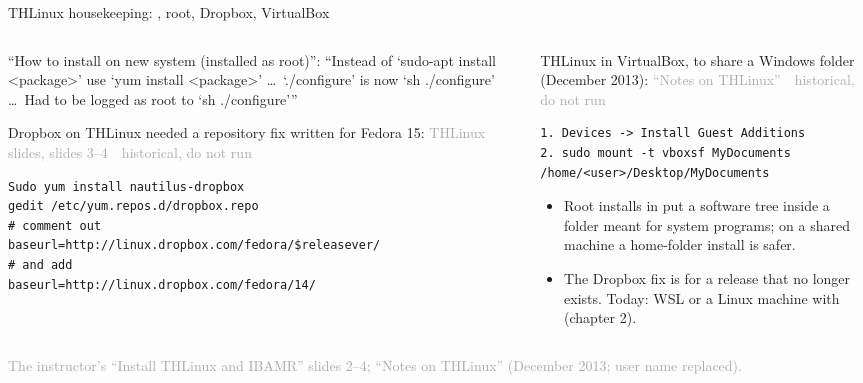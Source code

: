 \documentclass[aspectratio=169,11pt]{beamer}
\newcommand{\sourcecredit}[1]{\vfill\begin{flushright}\tiny\textcolor{DarkGray}{#1}\end{flushright}}
\newcommand{\hist}[1]{{\tiny\sffamily\textcolor{DarkGray}{#1\ \textbullet\ historical, do not run}}\par\nointerlineskip\vspace{0.3mm}}
\begin{document}
\begin{frame}[fragile]{THLinux housekeeping: , root, Dropbox, VirtualBox}
\label{fr:thlinux}
\begin{columns}[T,onlytextwidth]
\begin{column}{0.48\textwidth}
\footnotesize
``How to install on new system (installed as root)'': ``Instead of `sudo-apt install <package>' use `yum install <package>' \ldots\ `./configure' is now `sh ./configure' \ldots\ Had to be logged as root to `sh ./configure'{}''

\vspace{2mm}
Dropbox on THLinux needed a repository fix written for Fedora 15:
\hist{THLinux slides, slides 3--4}
\begin{lstlisting}[style=hist]
Sudo yum install nautilus-dropbox
gedit /etc/yum.repos.d/dropbox.repo
# comment out
baseurl=http://linux.dropbox.com/fedora/$releasever/
# and add
baseurl=http://linux.dropbox.com/fedora/14/
\end{lstlisting}
\end{column}
\begin{column}{0.49\textwidth}
\footnotesize
THLinux in VirtualBox, to share a Windows folder (December 2013):
\hist{``Notes on THLinux''}
\begin{lstlisting}[style=hist]
1. Devices -> Install Guest Additions
2. sudo mount -t vboxsf MyDocuments /home/<user>/Desktop/MyDocuments
\end{lstlisting}
\begin{itemize}\setlength{\itemsep}{2pt}
  \item Root installs in  put a software tree inside a folder meant for system programs; on a shared machine a home-folder install is safer.
  \item The Dropbox fix is for a release that no longer exists. Today: WSL or a Linux machine with  (chapter 2).
\end{itemize}
\end{column}
\end{columns}
\sourcecredit{The instructor's ``Install THLinux and IBAMR'' slides 2--4; ``Notes on THLinux'' (December 2013; user name replaced).}
\end{frame}
\end{document}
